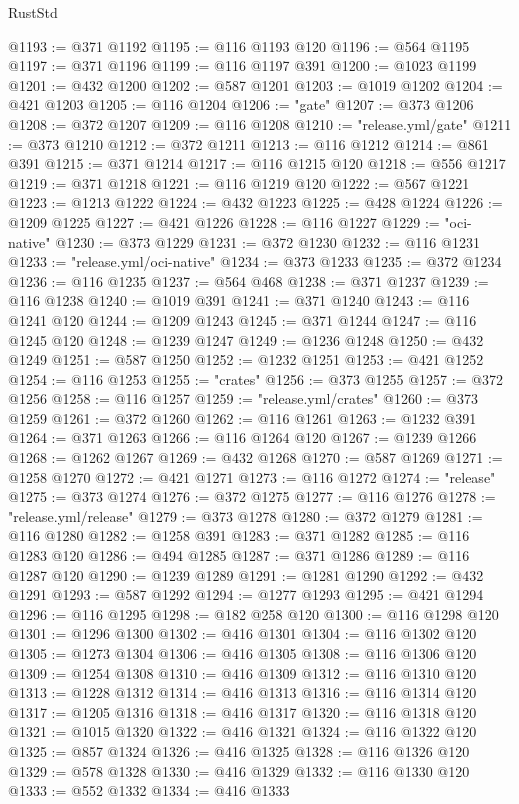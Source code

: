 \begin{lexlean}{RustStd}
\begin{coremodule}
@1193 := @371 @1192
@1195 := @116 @1193 @120
@1196 := @564 @1195
@1197 := @371 @1196
@1199 := @116 @1197 @391
@1200 := @1023 @1199
@1201 := @432 @1200
@1202 := @587 @1201
@1203 := @1019 @1202
@1204 := @421 @1203
@1205 := @116 @1204
@1206 := "gate"
@1207 := @373 @1206
@1208 := @372 @1207
@1209 := @116 @1208
@1210 := "release.yml/gate"
@1211 := @373 @1210
@1212 := @372 @1211
@1213 := @116 @1212
@1214 := @861 @391
@1215 := @371 @1214
@1217 := @116 @1215 @120
@1218 := @556 @1217
@1219 := @371 @1218
@1221 := @116 @1219 @120
@1222 := @567 @1221
@1223 := @1213 @1222
@1224 := @432 @1223
@1225 := @428 @1224
@1226 := @1209 @1225
@1227 := @421 @1226
@1228 := @116 @1227
@1229 := "oci-native"
@1230 := @373 @1229
@1231 := @372 @1230
@1232 := @116 @1231
@1233 := "release.yml/oci-native"
@1234 := @373 @1233
@1235 := @372 @1234
@1236 := @116 @1235
@1237 := @564 @468
@1238 := @371 @1237
@1239 := @116 @1238
@1240 := @1019 @391
@1241 := @371 @1240
@1243 := @116 @1241 @120
@1244 := @1209 @1243
@1245 := @371 @1244
@1247 := @116 @1245 @120
@1248 := @1239 @1247
@1249 := @1236 @1248
@1250 := @432 @1249
@1251 := @587 @1250
@1252 := @1232 @1251
@1253 := @421 @1252
@1254 := @116 @1253
@1255 := "crates"
@1256 := @373 @1255
@1257 := @372 @1256
@1258 := @116 @1257
@1259 := "release.yml/crates"
@1260 := @373 @1259
@1261 := @372 @1260
@1262 := @116 @1261
@1263 := @1232 @391
@1264 := @371 @1263
@1266 := @116 @1264 @120
@1267 := @1239 @1266
@1268 := @1262 @1267
@1269 := @432 @1268
@1270 := @587 @1269
@1271 := @1258 @1270
@1272 := @421 @1271
@1273 := @116 @1272
@1274 := "release"
@1275 := @373 @1274
@1276 := @372 @1275
@1277 := @116 @1276
@1278 := "release.yml/release"
@1279 := @373 @1278
@1280 := @372 @1279
@1281 := @116 @1280
@1282 := @1258 @391
@1283 := @371 @1282
@1285 := @116 @1283 @120
@1286 := @494 @1285
@1287 := @371 @1286
@1289 := @116 @1287 @120
@1290 := @1239 @1289
@1291 := @1281 @1290
@1292 := @432 @1291
@1293 := @587 @1292
@1294 := @1277 @1293
@1295 := @421 @1294
@1296 := @116 @1295
@1298 := @182 @258 @120
@1300 := @116 @1298 @120
@1301 := @1296 @1300
@1302 := @416 @1301
@1304 := @116 @1302 @120
@1305 := @1273 @1304
@1306 := @416 @1305
@1308 := @116 @1306 @120
@1309 := @1254 @1308
@1310 := @416 @1309
@1312 := @116 @1310 @120
@1313 := @1228 @1312
@1314 := @416 @1313
@1316 := @116 @1314 @120
@1317 := @1205 @1316
@1318 := @416 @1317
@1320 := @116 @1318 @120
@1321 := @1015 @1320
@1322 := @416 @1321
@1324 := @116 @1322 @120
@1325 := @857 @1324
@1326 := @416 @1325
@1328 := @116 @1326 @120
@1329 := @578 @1328
@1330 := @416 @1329
@1332 := @116 @1330 @120
@1333 := @552 @1332
@1334 := @416 @1333

\end{coremodule}
\end{lexlean}
